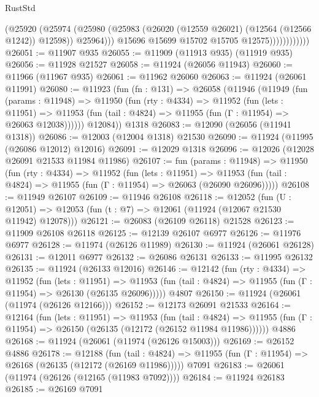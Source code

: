 \begin{lexlean}{RustStd}
\begin{coremodule}
{\begin{coremodule}
{{{{{{{{{{{{{{{{{{{{{{{{{{{{{{{{{{{{{{{{{{{{{{{{{{{{{{{{{{{{{{{{{{{{{{{{{{{{{{{{                            (@25920
                              (@25974
                                (@25980
                                  (@25983 (@26020 (@12559 @26021) (@12564 (@12566 @1242)) @12598))
                                  @25964)))
                            @15696
                            @15699
                            @15702
                            @15705
                            @12575))))))))))))
@26051 := @11907 @935
@26055 := @11909 (@11913 @935) (@11919 @935)
@26056 := @11928 @21527
@26058 := @11924 (@26056 @11943)
@26060 := @11966 (@11967 @935)
@26061 := @11962 @26060
@26063 := @11924 (@26061 @11991)
@26080 := @11923
    (fun (fn : @131) =>
    @26058
      (@11946
        (@11949
          (fun (params : @11948) =>
          @11950
            (fun (rty : @4334) =>
            @11952
              (fun (lets : @11951) =>
              @11953 (fun (tail : @4824) => @11955 (fun (Γ : @11954) => @26063 @12038))))))
        @12084))
    @1318
@26083 := @12090 (@26056 (@11941 @1318))
@26086 := @12003 (@12004 @1318) @21530
@26090 := @11924 (@11995 (@26086 @12012) @12016)
@26091 := @12029 @1318
@26096 := @12026 (@12028 @26091 @21533 @11984 @11986)
@26107 := fun (params : @11948) =>
  @11950
    (fun (rty : @4334) =>
    @11952
      (fun (lets : @11951) =>
      @11953 (fun (tail : @4824) => @11955 (fun (Γ : @11954) => @26063 (@26090 @26096)))))
@26108 := @11949 @26107
@26109 := @11946 @26108
@26118 := @12052
    (fun (U : @12051) => @12053 (fun (t : @7) => @12061 (@11924 (@12067 @21530 @11942) @12078)))
@26121 := @26083 (@26109 @26118) @21528
@26123 := @11909 @26108 @26118
@26125 := @12139 @26107 @6977
@26126 := @11976 @6977
@26128 := @11974 (@26126 @11989)
@26130 := @11924 (@26061 @26128)
@26131 := @12011 @6977
@26132 := @26086 @26131
@26133 := @11995 @26132
@26135 := @11924 (@26133 @12016)
@26146 := @12142
    (fun (rty : @4334) =>
    @11952
      (fun (lets : @11951) =>
      @11953 (fun (tail : @4824) => @11955 (fun (Γ : @11954) => @26130 (@26135 @26096)))))
    @4807
@26150 := @11924 (@26061 (@11974 (@26126 @12166)))
@26152 := @12173 @26091 @21533
@26164 := @12164
    (fun (lets : @11951) =>
    @11953
      (fun (tail : @4824) =>
      @11955 (fun (Γ : @11954) => @26150 (@26135 (@12172 (@26152 @11984 @11986))))))
    @4886
@26168 := @11924 (@26061 (@11974 (@26126 @15003)))
@26169 := @26152 @4886
@26178 := @12188
    (fun (tail : @4824) => @11955 (fun (Γ : @11954) => @26168 (@26135 (@12172 (@26169 @11986)))))
    @7091
@26183 := @26061 (@11974 (@26126 (@12165 (@11983 @7092))))
@26184 := @11924 @26183
@26185 := @26169 @7091
}}}}}}}}}}}}}}}}}}}}}}}}}}}}}}}}}}}}}}}}}}}}}}}}}}}}}}}}}}}}}}}}}}}}}}}}}}}}}}}}
\end{coremodule}}
\end{coremodule}
\end{lexlean}
